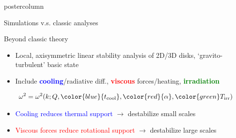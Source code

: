 \documentclass[final,hyperref={pdfpagelabels=false}]{beamer}
\begin{document}
\begin{frame}
\begin{columns}
\begin{column}{.49\textwidth}
\begin{beamercolorbox}[center,wd=\textwidth]{postercolumn}
\begin{minipage}[T]{.95\textwidth}
{\begin{block}{{\Large Simulations v.s. classic analyses}}
            \end{block}
            
            
            \begin{block}{\Large Beyond classic theory} 
              \justifying
              \begin{itemize}
              \item Local, axisymmetric linear stability analysis of
                2D/3D disks, `gravito-turbulent' basic state    
              \item Include {\bf\textcolor{blue}{cooling}}/radiative
                diff., {\bf \textcolor{red}{viscous}} forces/heating,
                {\bf \textcolor{green}{irradiation}} 
              \end{itemize}
              \begin{displaybox}{23cm}
                \begin{align*}
                  \omega^2 = \omega^2(k; Q,
                        {\color{blue}{t_\mathrm{cool}} },
                        {\color{red}{\alpha}},
                        {\color{green}T_\mathrm{irr}}) 
                \end{align*}
          \end{displaybox}
              \begin{itemize}
              \item \textcolor{blue}{Cooling reduces thermal
                support}  $\to$ destabilize small scales 
              \item  \textcolor{red}{Viscous forces reduce rotational
                support} $\to$ destabilize large scales 
              \end{itemize}
             \end{block}
             
             
             
          }
        \end{minipage}
      \end{beamercolorbox}
    \end{column}
    

\end{columns}
\end{frame}
\end{document}
